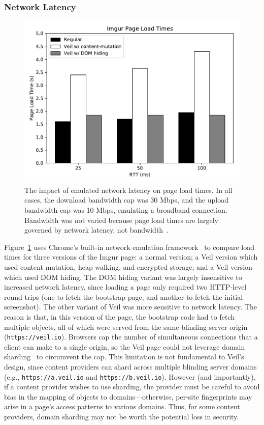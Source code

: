 \subsubsection{Network Latency}
\label{sec:lat}

\begin{figure}
	\centering
	\includegraphics[width=\textwidth]{veil-figs/network_em.pdf}
	\caption{The impact of emulated network latency on page load
		times. In all cases, the download bandwidth cap
		was 30 Mbps, and the upload bandwidth cap was 10
		Mbps, emulating a broadband connection. Bandwidth
		was not varied because page load times are largely
		governed by network latency, not bandwidth~\cite{gentleaggression}.}
	\label{fig:net_em}
\end{figure}

Figure~\ref{fig:net_em} uses Chrome's built-in network
emulation framework~\cite{chromeThrottle} to compare load times
for three versions of the Imgur page: a normal version;
a Veil version which used content mutation, heap
walking, and encrypted storage; and a Veil version
which used DOM hiding. The DOM hiding variant was largely
insensitive to increased network latency, since loading
a page only required two HTTP-level round trips (one to
fetch the bootstrap page, and another to fetch the initial
screenshot). The other variant of Veil was more sensitive
to network latency. The reason is that, in this version of
the page, the bootstrap code had to fetch multiple objects,
all of which were served from the same blinding server origin
(\texttt{https://veil.io}). Browsers cap the number
of simultaneous connections that a client can make to
a single origin, so the Veil page could not leverage
domain sharding~\cite{domainSharding} to circumvent the
cap. This limitation is not fundamental to Veil's design,
since content providers can shard across multiple blinding
server domains (e.g., \texttt{https://a.veil.io}
and \texttt{https://b.veil.io}). However (and
importantly), if a content provider wishes to use
sharding, the provider must be careful to avoid bias
in the mapping of objects to domains---otherwise,
per-site fingerprints may arise in a page's access
patterns to various domains. Thus, for some content
providers, domain sharding may not be worth the potential
loss in security.

